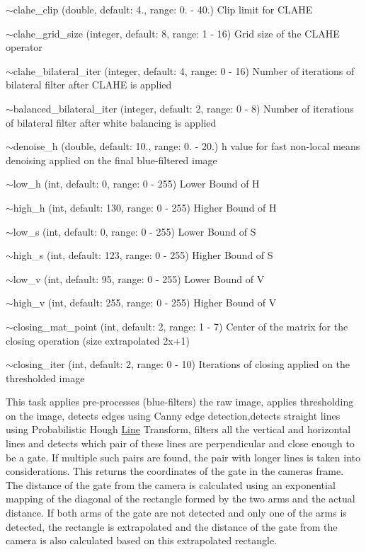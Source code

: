 \begin{DoxyItemize}
\item {\ttfamily $\sim$clahe\+\_\+clip} (double, default\+: 4., range\+: 0. -\/ 40.) Clip limit for C\+L\+A\+HE
\item {\ttfamily $\sim$clahe\+\_\+grid\+\_\+size} (integer, default\+: 8, range\+: 1 -\/ 16) Grid size of the C\+L\+A\+HE operator
\item {\ttfamily $\sim$clahe\+\_\+bilateral\+\_\+iter} (integer, default\+: 4, range\+: 0 -\/ 16) Number of iterations of bilateral filter after C\+L\+A\+HE is applied
\item {\ttfamily $\sim$balanced\+\_\+bilateral\+\_\+iter} (integer, default\+: 2, range\+: 0 -\/ 8) Number of iterations of bilateral filter after white balancing is applied
\item {\ttfamily $\sim$denoise\+\_\+h} (double, default\+: 10., range\+: 0. -\/ 20.) h value for fast non-\/local means denoising applied on the final blue-\/filtered image
\item {\ttfamily $\sim$low\+\_\+h} (int, default\+: 0, range\+: 0 -\/ 255) Lower Bound of H
\item {\ttfamily $\sim$high\+\_\+h} (int, default\+: 130, range\+: 0 -\/ 255) Higher Bound of H
\item {\ttfamily $\sim$low\+\_\+s} (int, default\+: 0, range\+: 0 -\/ 255) Lower Bound of S
\item {\ttfamily $\sim$high\+\_\+s} (int, default\+: 123, range\+: 0 -\/ 255) Higher Bound of S
\item {\ttfamily $\sim$low\+\_\+v} (int, default\+: 95, range\+: 0 -\/ 255) Lower Bound of V
\item {\ttfamily $\sim$high\+\_\+v} (int, default\+: 255, range\+: 0 -\/ 255) Higher Bound of V
\item {\ttfamily $\sim$closing\+\_\+mat\+\_\+point} (int, default\+: 2, range\+: 1 -\/ 7) Center of the matrix for the closing operation (size extrapolated 2x+1)
\item {\ttfamily $\sim$closing\+\_\+iter} (int, default\+: 2, range\+: 0 -\/ 10) Iterations of closing applied on the thresholded image
\end{DoxyItemize}

This task applies pre-\/processes (blue-\/filters) the raw image, applies thresholding on the image, detects edges using Canny edge detection,detects straight lines using Probabilistic Hough \hyperlink{classLine}{Line} Transform, filters all the vertical and horizontal lines and detects which pair of these lines are perpendicular and close enough to be a gate. If multiple such pairs are found, the pair with longer lines is taken into considerations. This returns the coordinates of the gate in the camera\textquotesingle{}s frame. The distance of the gate from the camera is calculated using an exponential mapping of the diagonal of the rectangle formed by the two arms and the actual distance. If both arms of the gate are not detected and only one of the arms is detected, the rectangle is extrapolated and the distance of the gate from the camera is also calculated based on this extrapolated rectangle.


